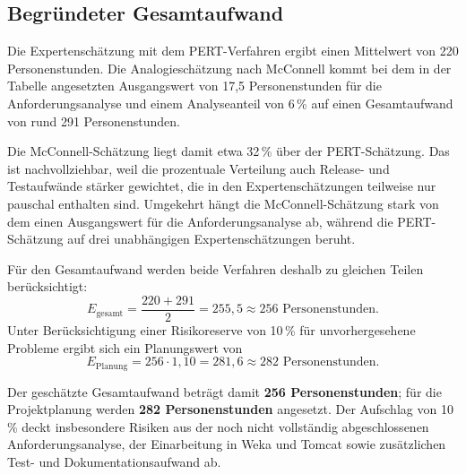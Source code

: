 \documentclass[a4paper,10pt]{article}
\begin{document}
\subsection*{Begründeter Gesamtaufwand}
Die Expertenschätzung mit dem PERT-Verfahren ergibt einen Mittelwert von
220 Personenstunden. Die Analogieschätzung nach McConnell kommt bei dem in der
Tabelle angesetzten Ausgangswert von 17,5 Personenstunden für die
Anforderungsanalyse und einem Analyseanteil von 6\,\% auf einen Gesamtaufwand
von rund 291 Personenstunden.

Die McConnell-Schätzung liegt damit etwa 32\,\% über der PERT-Schätzung. Das ist
nachvollziehbar, weil die prozentuale Verteilung auch Release- und Testaufwände
stärker gewichtet, die in den Expertenschätzungen teilweise nur pauschal
enthalten sind. Umgekehrt hängt die McConnell-Schätzung stark von dem einen
Ausgangswert für die Anforderungsanalyse ab, während die PERT-Schätzung auf drei
unabhängigen Expertenschätzungen beruht.

Für den Gesamtaufwand werden beide Verfahren deshalb zu gleichen Teilen
berücksichtigt:
\[
E_{\text{gesamt}} = \frac{220 + 291}{2} = 255{,}5 \approx 256
\text{ Personenstunden}.
\]
Unter Berücksichtigung einer Risikoreserve von 10\,\% für unvorhergesehene
Probleme ergibt sich ein Planungswert von
\[
E_{\text{Planung}} = 256 \cdot 1{,}10 = 281{,}6 \approx 282
\text{ Personenstunden}.
\]

Der geschätzte Gesamtaufwand beträgt damit \textbf{256 Personenstunden}; für die
Projektplanung werden \textbf{282 Personenstunden} angesetzt. Der Aufschlag von
10\,\% deckt insbesondere Risiken aus der noch nicht vollständig abgeschlossenen
Anforderungsanalyse, der Einarbeitung in Weka und Tomcat sowie zusätzlichen
Test- und Dokumentationsaufwand ab.
\end{document}
